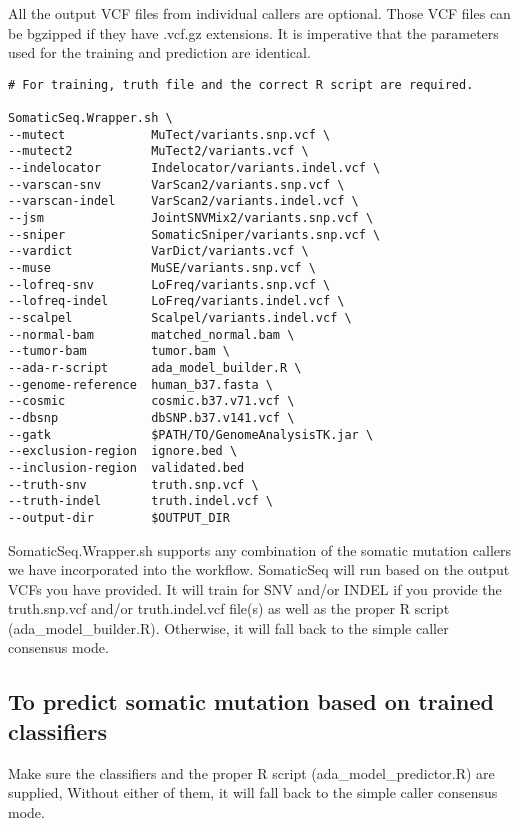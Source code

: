\documentclass[10pt,letterpaper]{article}
\begin{document}
\begin{sloppypar}
All the output VCF files from individual callers are optional. Those VCF files can be bgzipped if they have .vcf.gz extensions. It is imperative that the parameters used for the training and prediction are identical. 


\begin{lstlisting}
# For training, truth file and the correct R script are required.

SomaticSeq.Wrapper.sh \
--mutect            MuTect/variants.snp.vcf \
--mutect2           MuTect2/variants.vcf \
--indelocator       Indelocator/variants.indel.vcf \
--varscan-snv       VarScan2/variants.snp.vcf \
--varscan-indel     VarScan2/variants.indel.vcf \
--jsm               JointSNVMix2/variants.snp.vcf \
--sniper            SomaticSniper/variants.snp.vcf \
--vardict           VarDict/variants.vcf \
--muse              MuSE/variants.snp.vcf \
--lofreq-snv        LoFreq/variants.snp.vcf \
--lofreq-indel      LoFreq/variants.indel.vcf \
--scalpel           Scalpel/variants.indel.vcf \
--normal-bam        matched_normal.bam \
--tumor-bam         tumor.bam \
--ada-r-script      ada_model_builder.R \
--genome-reference  human_b37.fasta \
--cosmic            cosmic.b37.v71.vcf \
--dbsnp             dbSNP.b37.v141.vcf \
--gatk              $PATH/TO/GenomeAnalysisTK.jar \
--exclusion-region  ignore.bed \
--inclusion-region  validated.bed
--truth-snv         truth.snp.vcf \
--truth-indel       truth.indel.vcf \
--output-dir        $OUTPUT_DIR
\end{lstlisting}

SomaticSeq.Wrapper.sh supports any combination of the somatic mutation callers we have incorporated into the workflow. SomaticSeq will run based on the output VCFs you have provided. It will train for SNV and/or INDEL if you provide the truth.snp.vcf and/or truth.indel.vcf file(s) as well as the proper R script (ada\_model\_builder.R). Otherwise, it will fall back to the simple caller consensus mode.




\subsection{To predict somatic mutation based on trained classifiers}

Make sure the classifiers and the proper R script (ada\_model\_predictor.R) are supplied, Without either of them, it will fall back to the simple caller consensus mode.



\end{sloppypar}
\end{document}
